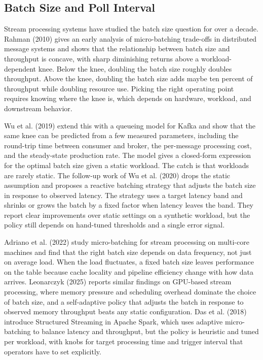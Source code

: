 \documentclass[10pt,a4paper]{article}
\begin{document}
\subsection{Batch Size and Poll Interval}

Stream processing systems have studied the batch size question for over a decade. Rahman (2010) gives an early analysis of micro-batching trade-offs in distributed message systems and shows that the relationship between batch size and throughput is concave, with sharp diminishing returns above a workload-dependent knee. Below the knee, doubling the batch size roughly doubles throughput. Above the knee, doubling the batch size adds maybe ten percent of throughput while doubling resource use. Picking the right operating point requires knowing where the knee is, which depends on hardware, workload, and downstream behavior.

Wu et al. (2019) extend this with a queueing model for Kafka and show that the same knee can be predicted from a few measured parameters, including the round-trip time between consumer and broker, the per-message processing cost, and the steady-state production rate. The model gives a closed-form expression for the optimal batch size given a static workload. The catch is that workloads are rarely static. The follow-up work of Wu et al. (2020) drops the static assumption and proposes a reactive batching strategy that adjusts the batch size in response to observed latency. The strategy uses a target latency band and shrinks or grows the batch by a fixed factor when latency leaves the band. They report clear improvements over static settings on a synthetic workload, but the policy still depends on hand-tuned thresholds and a single error signal.

Adriano et al. (2022) study micro-batching for stream processing on multi-core machines and find that the right batch size depends on data frequency, not just on average load. When the load fluctuates, a fixed batch size leaves performance on the table because cache locality and pipeline efficiency change with how data arrives. Leonarczyk (2025) reports similar findings on GPU-based stream processing, where memory pressure and scheduling overhead dominate the choice of batch size, and a self-adaptive policy that adjusts the batch in response to observed memory throughput beats any static configuration. Das et al. (2018) introduce Structured Streaming in Apache Spark, which uses adaptive micro-batching to balance latency and throughput, but the policy is heuristic and tuned per workload, with knobs for target processing time and trigger interval that operators have to set explicitly.
\end{document}
